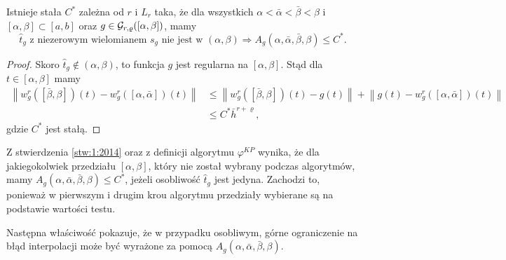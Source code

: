 \documentclass[oik, pdftex, man]{mgrwms}
\begin{document}
    \begin{stw} \label{stw:1:2014}
        Istnieje stała $C^{*}$ zależna od $r$ i $L_{r}$ taka, że dla wszystkich $\alpha < \bar{\alpha} < \bar{\beta} < \beta$ i $[\alpha, \beta] \subset [a, b]$ oraz  $g \in \mathcal{G}_{r,\varrho}([\alpha,\beta])$, mamy
        \begin{equation*}
            \hat{t}_{g} \text{ z niezerowym wielomianem } s_{g} \text{ nie jest w } (\alpha, \beta) \Longrightarrow A_{g}(\alpha, \bar{\alpha}, \bar{\beta}, \beta) \leq C^{*}.
        \end{equation*}
    \end{stw}
    \begin{proof}
        Skoro $\hat{t}_{g} \notin (\alpha, \beta)$, to funkcja $g$ jest regularna na $[\alpha, \beta]$. Stąd dla $t \in[\alpha, \beta]$ mamy
        \begin{equation*}
            \begin{aligned}
                \left\|w_{g}^{r}([\bar{\beta}, \beta])(t)-w_{g}^{r}([\alpha, \bar{\alpha}])(t)\right\| & \leq\left\|w_{g}^{r}([\bar{\beta}, \beta])(t)-g(t)\right\|+\left\|g(t)-w_{g}^{r}([\alpha, \bar{\alpha}])(t)\right\| \\
                & \leq C^{*} \bar{h}^{r+\varrho},
            \end{aligned}
        \end{equation*}
    gdzie $C^{*}$ jest stałą.
    \end{proof}

    \begin{uw} \label{uw:1}
        Z stwierdzenia \ref{stw:1:2014} oraz z definicji algorytmu $\varphi^{KP}$ wynika, że dla jakiegokolwiek przedziału $[\alpha, \beta]$, który nie został wybrany podczas algorytmów, mamy $A_{g}(\alpha, \bar{\alpha}, \bar{\beta}, \beta) \leq C^{*}$, jeżeli osobliwość $\hat{t}_{g}$ jest jedyna. Zachodzi to, ponieważ w pierwszym i drugim krou algorytmu przedziały wybierane są na podstawie wartości testu.
    \end{uw}

    Następna właściwość pokazuje, że w przypadku osobliwym, górne ograniczenie na błąd interpolacji może być wyrażone za pomocą $A_{g}(\alpha, \bar{\alpha}, \bar{\beta}, \beta)$.
\end{document}

